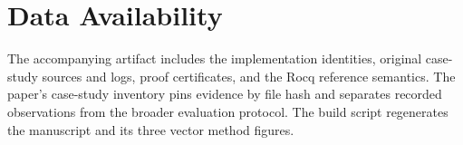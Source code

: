 \documentclass[10pt,conference]{IEEEtran}
\begin{document}
\section*{Data Availability}
The accompanying artifact includes the implementation identities, original
case-study sources and logs, proof certificates, and the Rocq reference
semantics. The paper's case-study inventory pins evidence by file hash and
separates recorded observations from the broader evaluation protocol.
The build script regenerates the manuscript and its three vector method figures.


\end{document}
